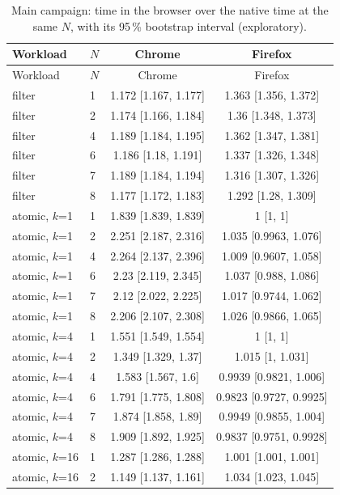 {\small
\begin{longtable}{llcc}
\caption{Main campaign: time in the browser over the native time at the same $N$, with its 95\,\% bootstrap interval (exploratory).}\label{tab:absolute} \\
\toprule
Workload & $N$ & Chrome & Firefox \\
\midrule
\endfirsthead
\toprule
Workload & $N$ & Chrome & Firefox \\
\midrule
\endhead
\bottomrule
\endfoot
filter & 1 & 1.172 [1.167, 1.177] & 1.363 [1.356, 1.372] \\
filter & 2 & 1.174 [1.166, 1.184] & 1.36 [1.348, 1.373] \\
filter & 4 & 1.189 [1.184, 1.195] & 1.362 [1.347, 1.381] \\
filter & 6 & 1.186 [1.18, 1.191] & 1.337 [1.326, 1.348] \\
filter & 7 & 1.189 [1.184, 1.194] & 1.316 [1.307, 1.326] \\
filter & 8 & 1.177 [1.172, 1.183] & 1.292 [1.28, 1.309] \\
\midrule
atomic, $k$=1 & 1 & 1.839 [1.839, 1.839] & 1 [1, 1] \\
atomic, $k$=1 & 2 & 2.251 [2.187, 2.316] & 1.035 [0.9963, 1.076] \\
atomic, $k$=1 & 4 & 2.264 [2.137, 2.396] & 1.009 [0.9607, 1.058] \\
atomic, $k$=1 & 6 & 2.23 [2.119, 2.345] & 1.037 [0.988, 1.086] \\
atomic, $k$=1 & 7 & 2.12 [2.022, 2.225] & 1.017 [0.9744, 1.062] \\
atomic, $k$=1 & 8 & 2.206 [2.107, 2.308] & 1.026 [0.9866, 1.065] \\
\midrule
atomic, $k$=4 & 1 & 1.551 [1.549, 1.554] & 1 [1, 1] \\
atomic, $k$=4 & 2 & 1.349 [1.329, 1.37] & 1.015 [1, 1.031] \\
atomic, $k$=4 & 4 & 1.583 [1.567, 1.6] & 0.9939 [0.9821, 1.006] \\
atomic, $k$=4 & 6 & 1.791 [1.775, 1.808] & 0.9823 [0.9727, 0.9925] \\
atomic, $k$=4 & 7 & 1.874 [1.858, 1.89] & 0.9949 [0.9855, 1.004] \\
atomic, $k$=4 & 8 & 1.909 [1.892, 1.925] & 0.9837 [0.9751, 0.9928] \\
\midrule
atomic, $k$=16 & 1 & 1.287 [1.286, 1.288] & 1.001 [1.001, 1.001] \\
atomic, $k$=16 & 2 & 1.149 [1.137, 1.161] & 1.034 [1.023, 1.045] \\

\end{longtable}}
